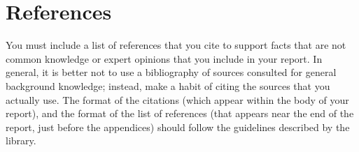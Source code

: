 \chapter{References}
You must include a list of references that you cite to support facts that are not common knowledge or expert opinions that you include in your report. In general, it is better not to use a bibliography of sources consulted for general background knowledge; instead, make a habit of citing the sources that you actually use. The format of the citations (which appear within the body of your report), and the format of the list of references (that appears near the end of the report, just before the appendices) should follow the guidelines described by the library.
